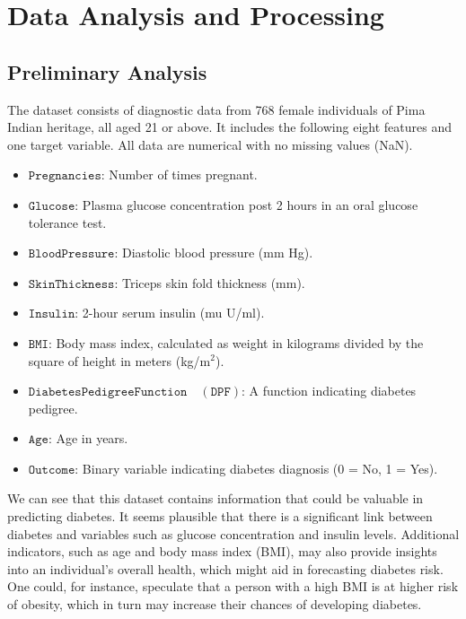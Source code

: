 \documentclass[12pt]{article}
\begin{document}
\section{Data Analysis and Processing}



\subsection{Preliminary Analysis}

\indent The dataset consists of diagnostic data from 768 female individuals of Pima Indian heritage, all aged 21 or above. It includes the following eight features and one target variable. All data are numerical with no missing values (NaN).

\vspace{-9pt}

\begin{itemize}
\setlength\itemsep{-0.3em}
\item $\mathtt{Pregnancies}$: Number of times pregnant.
\item $\mathtt{Glucose}$: Plasma glucose concentration post 2 hours in an oral glucose tolerance test.
\item $\mathtt{BloodPressure}$: Diastolic blood pressure (mm Hg).
\item $\mathtt{SkinThickness}$: Triceps skin fold thickness (mm).
\item $\mathtt{Insulin}$: 2-hour serum insulin (mu U/ml).
\item $\mathtt{BMI}$: Body mass index, calculated as weight in kilograms divided by the square of height in meters (kg/m$^2$).
\item $\mathtt{DiabetesPedigreeFunction} \quad \mathtt{(DPF)}$: A function indicating diabetes pedigree.
\item $\mathtt{Age}$: Age in years.
\item $\mathtt{Outcome}$: Binary variable indicating diabetes diagnosis (0 = No, 1 = Yes).
\end{itemize}

\vspace{-3pt}

We can see that this dataset contains information that could be valuable in predicting diabetes.
It seems plausible that there is a significant link
between diabetes and variables such as glucose concentration and insulin levels. 
Additional indicators, such as age and body mass index (BMI), may also provide insights into an individual's overall health, which might aid in forecasting diabetes risk.
One could, for instance, speculate that a person with a high BMI is at higher risk of obesity, which in turn may increase their chances of developing diabetes.
\end{document}
